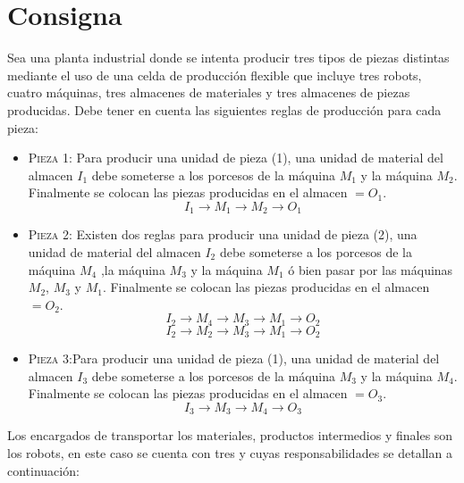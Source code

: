 \documentclass[12pt]{article} %
\begin{document}
\section{Consigna}
Sea una planta industrial donde se intenta producir tres tipos de piezas distintas mediante el uso de una celda de producción flexible que incluye tres robots, cuatro máquinas, tres almacenes de materiales y tres almacenes de piezas producidas.
Debe tener en cuenta las siguientes reglas de producción para cada pieza:
\begin{itemize}
\item \textsc{Pieza 1}: Para producir una unidad de pieza (1), una unidad de material del almacen $I_1$ debe someterse a los porcesos de la máquina $M_1$ y la máquina $M_2$. Finalmente se colocan las piezas producidas en el almacen $=O_1$.
$$I_1 \rightarrow M_1 \rightarrow M_2 \rightarrow O_1$$ 
\item \textsc{Pieza 2}: Existen dos reglas para producir una unidad de pieza (2), una unidad de material del almacen $I_2$ debe someterse a los porcesos de la máquina $M_4$ ,la máquina $M_3$ y la máquina $M_1$ ó bien pasar por las máquinas $M_2$, $M_3$ y $M_1$. Finalmente se colocan las piezas producidas en el almacen $=O_2$.
$$I_2 \rightarrow M_4 \rightarrow M_3 \rightarrow M_1 \rightarrow O_2$$
$$I_2 \rightarrow M_2 \rightarrow M_3 \rightarrow M_1 \rightarrow O_2$$
\item \textsc{Pieza 3}:Para producir una unidad de pieza (1), una unidad de material del almacen $I_3$ debe someterse a los porcesos de la máquina $M_3$ y la máquina $M_4$. Finalmente se colocan las piezas producidas en el almacen $=O_3$.
$$I_3 \rightarrow M_3 \rightarrow M_4 \rightarrow O_3$$ 
\end{itemize}
Los encargados de transportar los materiales, productos intermedios y finales son los robots, en este caso se cuenta con tres y cuyas responsabilidades se detallan a continuación:
\end{document}

